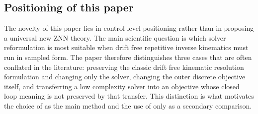 \subsection{Positioning of this paper}

The novelty of this paper lies in control level positioning rather than in proposing a universal new ZNN theory. The main scientific question is which solver reformulation is most suitable when drift free repetitive inverse kinematics must run in sampled form. The paper therefore distinguishes three cases that are often conflated in the literature: preserving the classic drift free kinematic resolution formulation and changing only the solver, changing the outer discrete objective itself, and transferring a low complexity solver into an objective whose closed loop meaning is not preserved by that transfer. This distinction is what motivates the choice of \methodtwoDL{} as the main method and the use of \methodthreepcg{} only as a secondary comparison.
